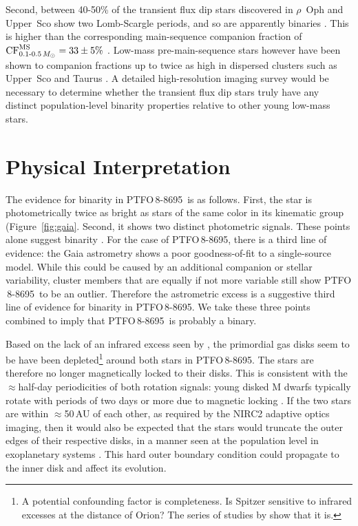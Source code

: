 \documentclass[12pt,twocolumn,tighten]{aastex62}
\newcommand{\ptfo}{PTFO$\,$8-8695}
\begin{document}
Second, between 40-50\% of the transient flux dip stars discovered in
$\rho$~Oph and Upper~Sco show two
Lomb-Scargle periods, and so are apparently binaries
\citep[][Table~1]{stauffer_orbiting_2017}.
This is higher than the corresponding main-sequence companion
fraction of ${\rm CF}_{0.1\text{-}0.5\,M_\odot}^{\rm MS} = 33 \pm 5\%$
\citep{henry_solar_2006,duchene_stellar_2013}.
Low-mass pre-main-sequence stars however have been shown to 
companion fractions up to twice as high in dispersed clusters such as
Upper~Sco and Taurus \citep{kraus_mapping_2008,kraus_mapping_2011}.
A detailed high-resolution imaging survey would be necessary to determine
whether the transient flux dip stars truly have any distinct
population-level binarity properties relative to other young low-mass
stars.






\section{Physical Interpretation}

The evidence for binarity in \ptfo\ is as follows.  First, the star is
photometrically twice as bright as stars of the same color in its
kinematic group (Figure~\ref{fig:gaia}.  Second, it shows two distinct
photometric signals.  These points alone suggest binarity
\citep{stauffer_rotevol_2018}.  For the case of \ptfo, there is a
third line of evidence: the Gaia astrometry shows a poor
goodness-of-fit to a single-source model.  While this could be caused
by an additional companion or stellar variability, cluster members
that are equally if not more variable still show \ptfo\ to be an
outlier.  Therefore the astrometric excess is a suggestive third line
of evidence for binarity in \ptfo.  We take these three points
combined to imply that \ptfo\ is probably a binary.

Based on the lack of an infrared excess seen by \citet{yu_tests_2015},
the primordial gas disks seem to be have been depleted\footnote{A
potential confounding factor is completeness. Is Spitzer sensitive to
infrared excesses at the distance of Orion? The series of studies by
\cite{hernandez_spitzer_2006,hernandez_spitzer_ob1_2007,hernandez_spitzer_sig_2007,hernandez_spitzer_2009}
show that it is.} around both stars in \ptfo. The stars are therefore
no longer magnetically locked to their disks.  This is consistent with
the $\approx$half-day periodicities of both rotation signals: young
disked M dwarfs typically rotate with periods of two days or more due
to magnetic locking \citep[{\it e.g.},][]{rebull_rotation_2020}.  If
the two stars are within $\approx$50$\,$AU of each other, as required
by the NIRC2 adaptive optics imaging, then it would also be expected
that the stars would truncate the outer edges of their respective
disks, in a manner seen at the population level in exoplanetary
systems \citep{kraus_impact_2016,moe_impact_2019}.  This hard outer
boundary condition could propagate to the inner disk and affect its
evolution.
\end{document}
